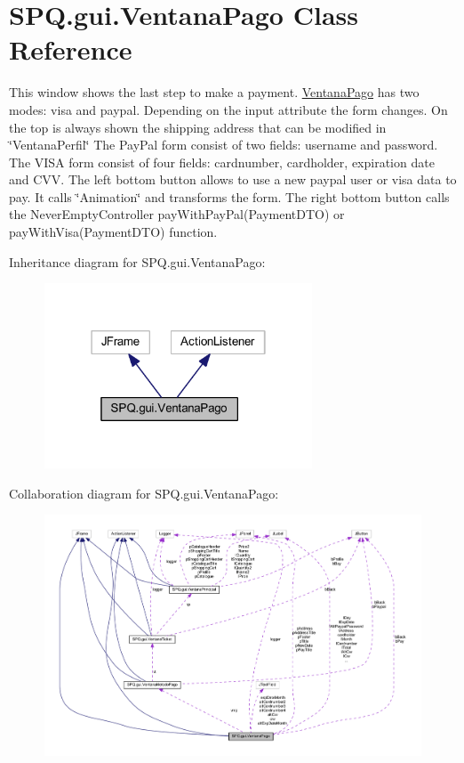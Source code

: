 \hypertarget{class_s_p_q_1_1gui_1_1_ventana_pago}{}\section{S\+P\+Q.\+gui.\+Ventana\+Pago Class Reference}
\label{class_s_p_q_1_1gui_1_1_ventana_pago}


This window shows the last step to make a payment. \mbox{\hyperlink{class_s_p_q_1_1gui_1_1_ventana_pago}{Ventana\+Pago}} has two modes\+: visa and paypal. Depending on the input attribute the form changes. On the top is always shown the shipping address that can be modified in \char`\"{}\+Ventana\+Perfil\char`\"{} The Pay\+Pal form consist of two fields\+: username and password. The V\+I\+SA form consist of four fields\+: cardnumber, cardholder, expiration date and C\+VV. The left bottom button allows to use a new paypal user or visa data to pay. It calls \char`\"{}\+Animation\char`\"{} and transforms the form. The right bottom button calls the Never\+Empty\+Controller pay\+With\+Pay\+Pal(\+Payment\+D\+T\+O) or pay\+With\+Visa(\+Payment\+D\+T\+O) function.  




Inheritance diagram for S\+P\+Q.\+gui.\+Ventana\+Pago\+:
\nopagebreak
\begin{figure}[H]
\begin{center}
\leavevmode
\includegraphics[width=226pt]{class_s_p_q_1_1gui_1_1_ventana_pago__inherit__graph}
\end{center}
\end{figure}


Collaboration diagram for S\+P\+Q.\+gui.\+Ventana\+Pago\+:
\nopagebreak
\begin{figure}[H]
\begin{center}
\leavevmode
\includegraphics[width=350pt]{class_s_p_q_1_1gui_1_1_ventana_pago__coll__graph}
\end{center}
\end{figure}
